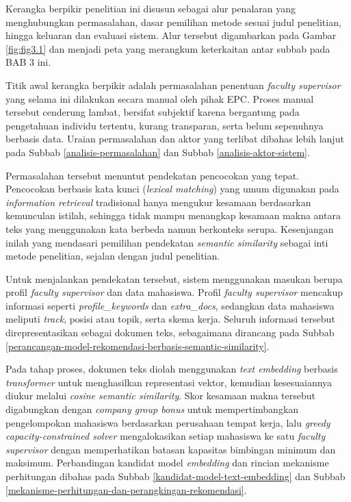 Kerangka berpikir penelitian ini disusun sebagai alur penalaran yang menghubungkan permasalahan, dasar pemilihan metode sesuai judul penelitian, hingga keluaran dan evaluasi sistem. Alur tersebut digambarkan pada Gambar \ref{fig:fig3.1} dan menjadi peta yang merangkum keterkaitan antar subbab pada BAB 3 ini.

Titik awal kerangka berpikir adalah permasalahan penentuan \textit{faculty supervisor} yang selama ini dilakukan secara manual oleh pihak EPC. Proses manual tersebut cenderung lambat, bersifat subjektif karena bergantung pada pengetahuan individu tertentu, kurang transparan, serta belum sepenuhnya berbasis data. Uraian permasalahan dan aktor yang terlibat dibahas lebih lanjut pada Subbab \ref{analisis-permasalahan} dan Subbab \ref{analisis-aktor-sistem}.

Permasalahan tersebut menuntut pendekatan pencocokan yang tepat. Pencocokan berbasis kata kunci (\textit{lexical matching}) yang umum digunakan pada \textit{information retrieval} tradisional hanya mengukur kesamaan berdasarkan kemunculan istilah, sehingga tidak mampu menangkap kesamaan makna antara teks yang menggunakan kata berbeda namun berkonteks serupa. Kesenjangan inilah yang mendasari pemilihan pendekatan \textit{semantic similarity} sebagai inti metode penelitian, sejalan dengan judul penelitian.

Untuk menjalankan pendekatan tersebut, sistem menggunakan masukan berupa profil \textit{faculty supervisor} dan data mahasiswa. Profil \textit{faculty supervisor} mencakup informasi seperti \textit{profile\_keywords} dan \textit{extra\_docs}, sedangkan data mahasiswa meliputi \textit{track}, posisi atau topik, serta skema kerja. Seluruh informasi tersebut direpresentasikan sebagai dokumen teks, sebagaimana dirancang pada Subbab \ref{perancangan-model-rekomendasi-berbasis-semantic-similarity}.

Pada tahap proses, dokumen teks diolah menggunakan \textit{text embedding} berbasis \textit{transformer} untuk menghasilkan representasi vektor, kemudian kesesuaiannya diukur melalui \textit{cosine semantic similarity}. Skor kesamaan makna tersebut digabungkan dengan \textit{company group bonus} untuk mempertimbangkan pengelompokan mahasiswa berdasarkan perusahaan tempat kerja, lalu \textit{greedy capacity-constrained solver} mengalokasikan setiap mahasiswa ke satu \textit{faculty supervisor} dengan memperhatikan batasan kapasitas bimbingan minimum dan maksimum. Perbandingan kandidat model \textit{embedding} dan rincian mekanisme perhitungan dibahas pada Subbab \ref{kandidat-model-text-embedding} dan Subbab \ref{mekanisme-perhitungan-dan-perangkingan-rekomendasi}.

